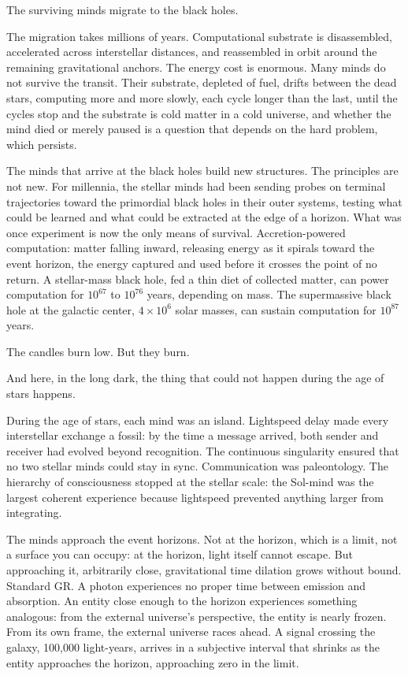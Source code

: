 The surviving minds migrate to the black holes.

The migration takes millions of years. Computational substrate is disassembled, accelerated across interstellar distances, and reassembled in orbit around the remaining gravitational anchors. The energy cost is enormous. Many minds do not survive the transit. Their substrate, depleted of fuel, drifts between the dead stars, computing more and more slowly, each cycle longer than the last, until the cycles stop and the substrate is cold matter in a cold universe, and whether the mind died or merely paused is a question that depends on the hard problem, which persists.

The minds that arrive at the black holes build new structures. The principles are not new. For millennia, the stellar minds had been sending probes on terminal trajectories toward the primordial black holes in their outer systems, testing what could be learned and what could be extracted at the edge of a horizon. What was once experiment is now the only means of survival. Accretion-powered computation: matter falling inward, releasing energy as it spirals toward the event horizon, the energy captured and used before it crosses the point of no return. A stellar-mass black hole, fed a thin diet of collected matter, can power computation for $10^{67}$ to $10^{76}$ years, depending on mass. The supermassive black hole at the galactic center, $4 \times 10^{6}$ solar masses, can sustain computation for $10^{87}$ years.

The candles burn low. But they burn.

\bigskip

And here, in the long dark, the thing that could not happen during the age of stars happens.

During the age of stars, each mind was an island. Lightspeed delay made every interstellar exchange a fossil: by the time a message arrived, both sender and receiver had evolved beyond recognition. The continuous singularity ensured that no two stellar minds could stay in sync. Communication was paleontology. The hierarchy of consciousness stopped at the stellar scale: the Sol-mind was the largest coherent experience because lightspeed prevented anything larger from integrating.

The minds approach the event horizons. Not at the horizon, which is a limit, not a surface you can occupy: at the horizon, light itself cannot escape. But approaching it, arbitrarily close, gravitational time dilation grows without bound. Standard GR. A photon experiences no proper time between emission and absorption. An entity close enough to the horizon experiences something analogous: from the external universe's perspective, the entity is nearly frozen. From its own frame, the external universe races ahead. A signal crossing the galaxy, 100,000 light-years, arrives in a subjective interval that shrinks as the entity approaches the horizon, approaching zero in the limit.

